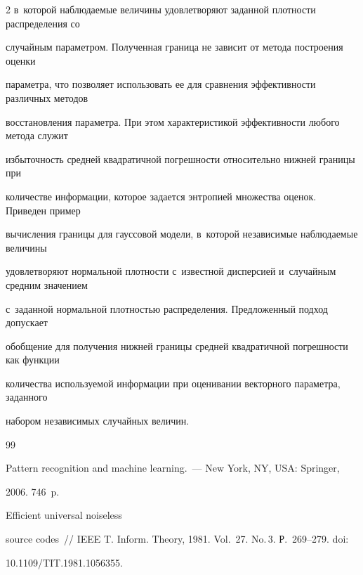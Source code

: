 \begin{multicols}{2}
в~которой наблюдаемые величины удовле\-тво\-ря\-ют заданной плот\-ности распределения со 


случайным па\-ра\-мет\-ром. Полученная граница не зависит от метода по\-стро\-ения оценки 


па\-ра\-мет\-ра, что поз\-во\-ля\-ет использовать ее для сравнения эф\-фек\-тив\-ности различных методов 


восстановления па\-ра\-мет\-ра. При этом характеристикой эф\-фек\-тив\-ности любого метода служит 


из\-бы\-точ\-ность сред\-ней квад\-ра\-тич\-ной по\-греш\-ности относительно ниж\-ней границы при 


количестве информации, которое задается энт\-ро\-пи\-ей множества оценок. Приведен пример 


вычисления границы для гауссовой модели, в~которой независимые наблюдаемые величины 


удовле\-тво\-ря\-ют нормальной плот\-ности с~известной дис\-пер\-си\-ей и~случайным средним значением 


с~заданной нормальной плот\-ностью распределения. Предложенный подход допускает 


обобщение для получения ниж\-ней границы средней квад\-ра\-тич\-ной по\-греш\-ности как функции 


количества ис\-поль\-зу\-емой информации при оценивании векторного па\-ра\-мет\-ра, заданного 


набором независимых случайных величин.





{\small\frenchspacing


 {\baselineskip=10.6pt




 \begin{thebibliography}{99}




 Pattern recognition and machine learning.~--- New York, NY, USA: Springer, 


2006. 746~p. %




 Efficient universal noiseless 


source codes~// IEEE T. Inform. Theory, 1981. Vol.~27. No.\,3. Р.~269--279. doi: 


10.1109/TIT.1981.1056355.



\end{thebibliography}}}
\end{multicols}
